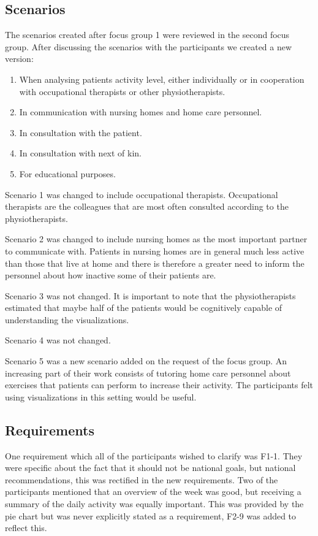 \subsection{Scenarios}
The scenarios created after focus group 1 were reviewed in the second focus group. After discussing the scenarios with the participants we created a new version:
\vspace{-6mm}
\begin{enumerate}[itemsep=0cm, parsep=0cm]
\item When analysing patients activity level, either individually or in cooperation with occupational therapists or other physiotherapists.
\item In communication with nursing homes and home care personnel.
\item In consultation with the patient.
\item In consultation with next of kin.
\item For educational purposes.
\end{enumerate}

Scenario 1 was changed to include occupational therapists. Occupational therapists are the colleagues that are most often consulted according to the physiotherapists. 

Scenario 2 was changed to include nursing homes as the most important partner to communicate with. Patients in nursing homes are in general much less active than those that live at home and there is therefore a greater need to inform the personnel about how inactive some of their patients are.

Scenario 3 was not changed. It is important to note that the physiotherapists estimated that maybe half of the patients would be cognitively capable of understanding the visualizations.

Scenario 4 was not changed.

Scenario 5 was a new scenario added on the request of the focus group. An increasing part of their work consists of tutoring home care personnel about exercises that patients can perform to increase their activity. The participants felt using visualizations in this setting would be useful. 

\subsection{Requirements}
One requirement which all of the participants wished to clarify was F1-1. They were specific about the fact that it should not be national goals, but national recommendations, this was rectified in the new requirements. Two of the participants mentioned that an overview of the week was good, but receiving a summary of the daily activity was equally important. This was provided by the pie chart but was never explicitly stated as a requirement, F2-9 was added to reflect this.

